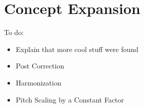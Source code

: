 \section{Concept Expansion}

\color{red}
To do:
\begin{itemize}
	\item Explain that more cool stuff were found
	\item Post Correction
	\item Harmonization
	\item Pitch Scaling by a Constant Factor
\end{itemize}
\color{black}
